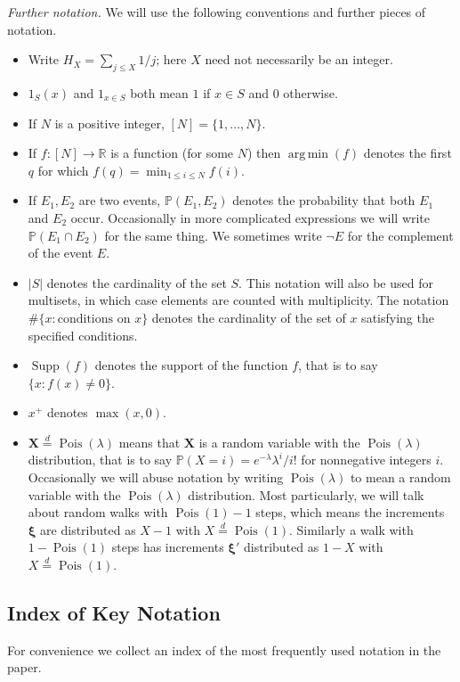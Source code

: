 \documentclass[11pt,reqno]{amsart}
\DeclareMathOperator*{\argmin}{arg\,min}
\numberwithin{equation}{section}
\theoremstyle{definition}
\theoremstyle{remark}
\newcommand{\mb}{\mathbb}
\newcommand{\mbf}{\mathbf}
\newcommand\Supp{\operatorname{Supp}}
\newcommand\Pois{\operatorname{Pois}}
\def\boldxi{\boldsymbol\xi}
\renewcommand{\le}{\leqslant}
\newcommand\R{\mathbb{R}}
\newcommand\samedist{\overset{d}{=}}
\begin{document}
\emph{Further notation.} We will use the following conventions and further pieces of notation.
\begin{itemize}
\item Write $H_X = \sum_{j \le X} 1/j$; here $X$ need not necessarily be an integer.
\item $1_S(x)$ and $1_{x \in S}$ both mean $1$ if $x \in S$ and $0$ otherwise.
\item If $N$ is a positive integer, $[N] = \{1,\dots, N\}$.
\item If $f : [N] \rightarrow \R$ is a function (for some $N$) then $\argmin(f)$ denotes the first $q$ for which $f(q) = \min_{1 \le i \le N} f(i)$. 
\item If $E_1, E_2$ are two events, $\mb{P}(E_1, E_2)$ denotes the probability that both $E_1$ and $E_2$ occur. Occasionally in more complicated expressions we will write $\mb{P}(E_1 \cap E_2)$ for the same thing. We sometimes write $\neg E$ for the complement of the event $E$.
\item $|S|$ denotes the cardinality of the set $S$. This notation will also be used for multisets, in which case elements are counted with multiplicity. The notation $\# \{x : \text{conditions on $x$}\}$ denotes the cardinality of the set of $x$ satisfying the specified conditions. 
\item $\Supp(f)$ denotes the support of the function $f$, that is to say $\{ x : f(x) \ne 0\}$.
\item $x^+$ denotes $\max(x, 0)$.
\item $\mbf{X} \samedist \Pois(\lambda)$ means that $\mbf{X}$ is a random variable with the $\Pois(\lambda)$ distribution, that is to say $\mb{P}(X = i) = e^{-\lambda}\lambda^i/i!$ for nonnegative integers $i$. Occasionally we will abuse notation by writing $\Pois(\lambda)$ to mean a random variable with the $\Pois(\lambda)$ distribution. Most particularly, we will talk about random walks with $\Pois(1)-1$ steps, which means the increments $\boldxi$ are distributed as $X - 1$ with $X \samedist \Pois(1)$. Similarly a walk with $1 - \Pois(1)$ steps has increments $\boldxi'$ distributed as $1 - X$ with $X \samedist \Pois(1)$.
\end{itemize}


\subsection*{Index of Key Notation}
For convenience we collect an index of the most frequently used notation in the paper.
\end{document}

